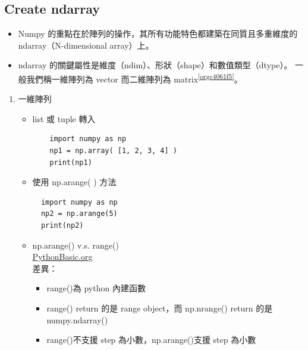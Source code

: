 \documentclass[a4paper,12pt]{article}
\begin{document}
\subsection{Create ndarray}
\label{sec:org345fa6d}
\begin{itemize}
\item Numpy 的重點在於陣列的操作，其所有功能特色都建築在同質且多重維度的 ndarray（N-dimensional array）上。\\
\item ndarray 的關鍵屬性是維度（ndim）、形狀（shape）和數值類型（dtype）。 一般我們稱一維陣列為 vector 而二維陣列為 matrix\textsuperscript{\ref{orgc4061f5}}。\\
\end{itemize}
\begin{enumerate}
\item 一維陣列
\label{sec:org0f7e1df}
\begin{itemize}
\item list 或 tuple 轉入\\
\lstset{breaklines=true,language=Python,label= ,caption= ,captionpos=b,firstnumber=1,numbers=left}
\begin{lstlisting}
    import numpy as np
    np1 = np.array( [1, 2, 3, 4] )
    print(np1)
\end{lstlisting}

\begin{results}
\end{results}

\item 使用 np.arange( ) 方法\\
\lstset{breaklines=true,language=Python,label= ,caption= ,captionpos=b,firstnumber=1,numbers=left}
\begin{lstlisting}
  import numpy as np
  np2 = np.arange(5)
  print(np2)
\end{lstlisting}

\item np.arange() v.s. range()\\
\url{PythonBasic.org}\\
差異：\\
\begin{itemize}
\item range()為 python 內建函數\\
\item range() return 的是 range object，而 np.nrange() return 的是 numpy.ndarray()\\
\item range()不支援 step 為小數，np.arange()支援 step 為小數\\
\end{itemize}
\end{itemize}


\end{enumerate}
\end{document}
